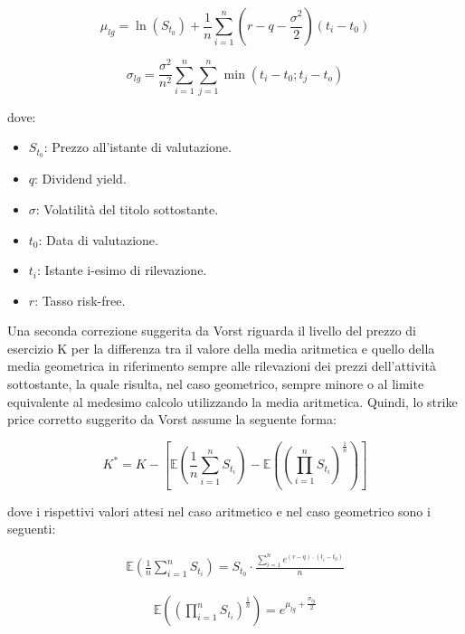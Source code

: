 \documentclass[12pt,a4paper]{report}
\begin{document}
\begin{equation}
    \mu_{lg} = \ln(S_{t_0}) + \frac{1}{n} \sum_{i=1}^{n}(r - q - \frac{\sigma^2}{2}) (t_i - t_0)
\end{equation}

\begin{equation}
    \sigma_{lg} = \frac{\sigma^2}{n^2} \sum_{i=1}^{n} \sum_{j=1}^{n}\min\left(t_i - t_0; t_j - t_o\right)
\end{equation}


dove:

\begin{itemize}
    \item $S_{t_0}$: Prezzo all'istante di valutazione.
    \item $q$: Dividend yield.
    \item $\sigma$: Volatilità del titolo sottostante.
    \item $t_0$: Data di valutazione.
    \item $t_i$: Istante i-esimo di rilevazione.
    \item $r$: Tasso risk-free.
\end{itemize}

Una seconda correzione suggerita da Vorst riguarda il livello del prezzo di esercizio K per la differenza tra il valore della media aritmetica e quello della media geometrica in riferimento sempre alle rilevazioni dei prezzi dell'attività sottostante, la quale risulta, nel caso geometrico, sempre minore o al limite equivalente al medesimo calcolo utilizzando la media aritmetica. Quindi, lo strike price corretto suggerito da Vorst assume la seguente forma:

\begin{equation}
    K^* = K - \left[ \mathbb{E}\left(\frac{1}{n}\sum_{i=1}^{n}S_{t_i}\right) - \mathbb{E}\left(\left(\prod_{i=1}^{n}S_{t_i}\right)^\frac{1}{n}\right) \right]
\end{equation}

dove i rispettivi valori attesi nel caso aritmetico e nel caso geometrico sono i seguenti:

\begin{align*}
   \mathbb{E}\left(\frac{1}{n}\sum_{i=1}^{n}S_{t_i}\right) = S_{t_0} \cdot \frac{\sum_{i=1}^{n}e^{(r-q)\cdot(t_i - t_0)}}{n}
\end{align*}

\begin{align*} \mathbb{E}\left(\left(\prod_{i=1}^{n}S_{t_i}\right)^\frac{1}{n}\right) = e^{\mu_{lg} + \frac{\sigma_{lg}}{2}}
\end{align*}
\end{document}
